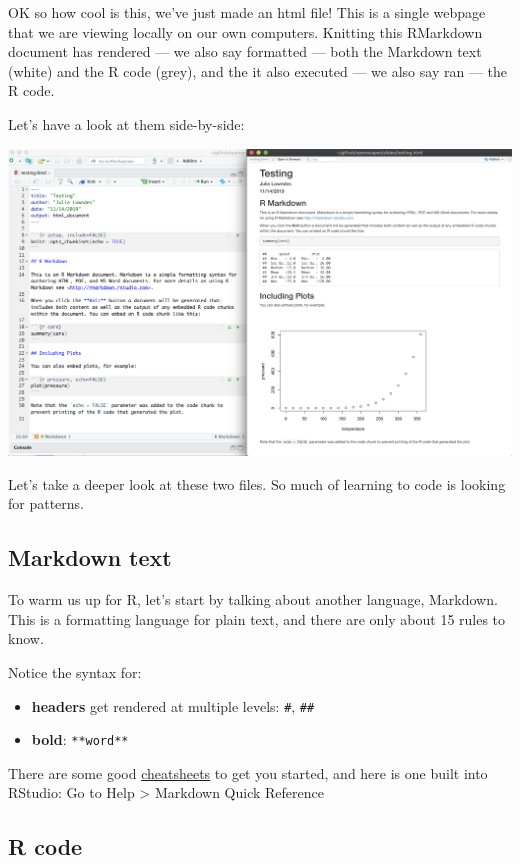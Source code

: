 \documentclass[]{book}
\providecommand{\tightlist}{%
  \setlength{\itemsep}{0pt}\setlength{\parskip}{0pt}}
\begin{document}
OK so how cool is this, we've just made an html file! This is a single webpage that we are viewing locally on our own computers. Knitting this RMarkdown document has rendered --- we also say formatted --- both the Markdown text (white) and the R code (grey), and the it also executed --- we also say ran --- the R code.

Let's have a look at them side-by-side:

\includegraphics[width=0.8\linewidth]{img/rmarkdown_side_by_side}

Let's take a deeper look at these two files. So much of learning to code is looking for patterns.

\hypertarget{markdown-text}{%
\subsection{Markdown text}\label{markdown-text}}

To warm us up for R, let's start by talking about another language, Markdown. This is a formatting language for plain text, and there are only about 15 rules to know.

Notice the syntax for:

\begin{itemize}
\tightlist
\item
  \textbf{headers} get rendered at multiple levels: \texttt{\#}, \texttt{\#\#}
\item
  \textbf{bold}: \texttt{**word**}
\end{itemize}

There are some good \href{https://github.com/adam-p/markdown-here/wiki/Markdown-Here-Cheatsheet}{cheatsheets} to get you started, and here is one built into RStudio: Go to Help \textgreater{} Markdown Quick Reference

\hypertarget{r-code}{%
\subsection{R code}\label{r-code}}
\end{document}
